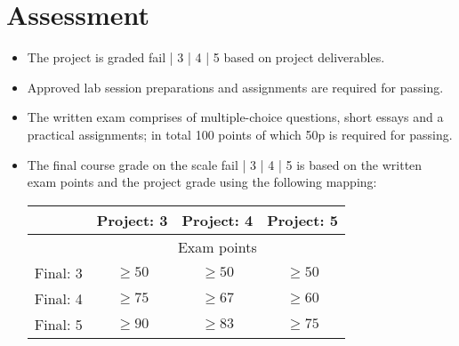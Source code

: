 \documentclass{program}
\begin{document}
\section{Assessment}
\begin{itemize}
\item The project is graded fail | 3 | 4 | 5 based on project deliverables.
\item Approved lab session preparations and assignments are required for passing.
\item The written exam comprises of  multiple-choice questions, short essays and a practical assignments; in total 100 points of which 50p is required for passing. %
\item The final course grade on the scale fail | 3 | 4 | 5 is based on the written exam points and the project grade using the following mapping: 

\vspace{1em}

\begin{tabular}{r | c c c}
 & Project: 3 & Project: 4 & Project: 5 \\
\hline
 & \multicolumn{3}{c}{Exam points}    \\
Final: 3 & $ \geq 50$ & $\geq 50$ & $\geq 50$ \\
Final: 4 & $ \geq 75$ & $\geq 67$ & $\geq 60$ \\
Final: 5 & $ \geq 90$ & $\geq 83$ & $\geq 75$ \\
\hline
\end{tabular}


\end{itemize}

\newpage
\end{document}
